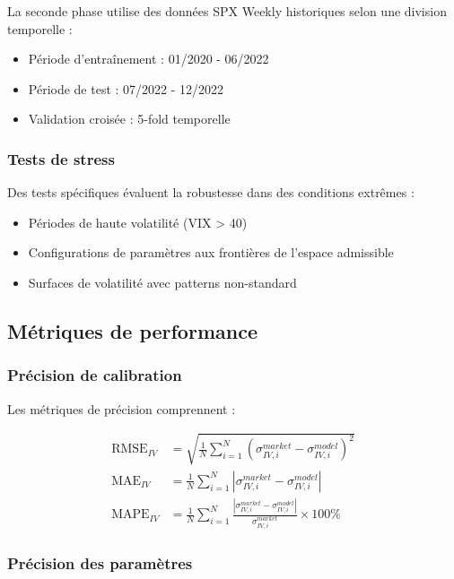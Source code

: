 La seconde phase utilise des données SPX Weekly historiques selon une division temporelle :
\begin{itemize}
\item Période d'entraînement : 01/2020 - 06/2022
\item Période de test : 07/2022 - 12/2022
\item Validation croisée : 5-fold temporelle
\end{itemize}

\subsubsection{Tests de stress}

Des tests spécifiques évaluent la robustesse dans des conditions extrêmes :
\begin{itemize}
\item Périodes de haute volatilité (VIX > 40)
\item Configurations de paramètres aux frontières de l'espace admissible
\item Surfaces de volatilité avec patterns non-standard
\end{itemize}

\subsection{Métriques de performance}

\subsubsection{Précision de calibration}

Les métriques de précision comprennent :

\begin{align}
\text{RMSE}_{IV} &= \sqrt{\frac{1}{N} \sum_{i=1}^{N} \left(\sigma_{IV,i}^{market} - \sigma_{IV,i}^{model}\right)^2} \\
\text{MAE}_{IV} &= \frac{1}{N} \sum_{i=1}^{N} \left|\sigma_{IV,i}^{market} - \sigma_{IV,i}^{model}\right| \\
\text{MAPE}_{IV} &= \frac{1}{N} \sum_{i=1}^{N} \frac{\left|\sigma_{IV,i}^{market} - \sigma_{IV,i}^{model}\right|}{\sigma_{IV,i}^{market}} \times 100\%
\end{align}

\subsubsection{Précision des paramètres}

